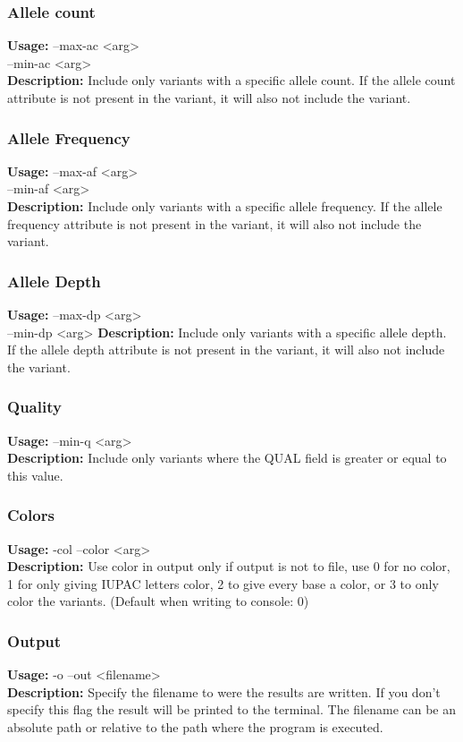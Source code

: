 \subsubsection{Allele count}
\textbf{Usage:} --max-ac <arg> \\
\tab--min-ac <arg>\\
\textbf{Description:} Include only variants with a specific allele count. If the allele count attribute is not present in the variant, it will also not include the variant.

\subsubsection{Allele Frequency}
\textbf{Usage:} --max-af <arg> \\
\tab--min-af <arg>\\
\textbf{Description:} Include only variants with a specific allele frequency. If the allele frequency attribute is not present in the variant, it will also not include the variant.

\subsubsection{Allele Depth}
\textbf{Usage:} --max-dp <arg> \\
\tab --min-dp <arg>
\textbf{Description:} Include only variants with a specific allele depth. If the allele depth attribute is not present in the variant, it will also not include the variant.

\subsubsection{Quality}
\textbf{Usage:} --min-q <arg> \\
\textbf{Description:} Include only variants where the QUAL field is greater or equal to this value. 

\subsubsection{Colors}
\textbf{Usage:} -col --color <arg> \\
\textbf{Description:}  Use color in output only if output is not to file, use 0 for no color, 1 for only giving IUPAC letters color, 2 to give every base a color, or 3 to only color the variants. (Default when writing to console: 0)

\subsubsection{Output}
\textbf{Usage:} -o --out <filename>\\
\textbf{Description:} Specify the filename to were the results are written. If you don't specify this flag the result will be printed to the terminal. The filename can be an absolute path or relative to the path where the program is executed.

